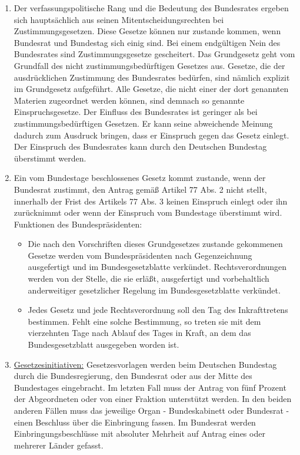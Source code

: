 \documentclass{article}
\begin{document}
\begin{enumerate}[label=(\alph*)]
		\item Der verfassungspolitische Rang und die Bedeutung des Bundesrates ergeben sich hauptsächlich aus seinen Mitentscheidungsrechten bei Zustimmungsgesetzen. Diese Gesetze können nur zustande kommen, wenn Bundesrat und Bundestag sich einig sind. Bei einem endgültigen Nein des Bundesrates sind Zustimmungsgesetze gescheitert. Das Grundgesetz geht vom Grundfall des nicht zustimmungsbedürftigen Gesetzes aus. Gesetze, die der ausdrücklichen Zustimmung des Bundesrates bedürfen, sind nämlich explizit im Grundgesetz aufgeführt. Alle Gesetze, die nicht einer der dort genannten Materien zugeordnet werden können, sind demnach so genannte Einspruchsgesetze. Der Einfluss des Bundesrates ist geringer als bei zustimmungsbedürftigen Gesetzen. Er kann seine abweichende Meinung dadurch zum Ausdruck bringen, dass er Einspruch gegen das Gesetz einlegt. Der Einspruch des Bundesrates kann durch den Deutschen Bundestag überstimmt werden.
		\item Ein vom Bundestage beschlossenes Gesetz kommt zustande, wenn der Bundesrat zustimmt, den Antrag gemäß Artikel 77 Abs. 2 nicht stellt, innerhalb der Frist des Artikels 77 Abs. 3 keinen Einspruch einlegt oder ihn zurücknimmt oder wenn der Einspruch vom Bundestage überstimmt wird. Funktionen des Bundespräsidenten:
		\begin{itemize}
			\item Die nach den Vorschriften dieses Grundgesetzes zustande gekommenen Gesetze werden vom Bundespräsidenten nach Gegenzeichnung ausgefertigt und im Bundesgesetzblatte verkündet. Rechtsverordnungen werden von der Stelle, die sie erläßt, ausgefertigt und vorbehaltlich anderweitiger gesetzlicher Regelung im Bundesgesetzblatte verkündet.
			\item Jedes Gesetz und jede Rechtsverordnung soll den Tag des Inkrafttretens bestimmen. Fehlt eine solche Bestimmung, so treten sie mit dem vierzehnten Tage nach Ablauf des Tages in Kraft, an dem das Bundesgesetzblatt ausgegeben worden ist.
		\end{itemize}
		\item \underline{Gesetzesinitiativen:} Gesetzesvorlagen werden beim Deutschen Bundestag durch die Bundesregierung, den Bundesrat oder aus der Mitte des Bundestages eingebracht. Im letzten Fall muss der Antrag von fünf Prozent der Abgeordneten oder von einer Fraktion unterstützt werden. In den beiden anderen Fällen muss das jeweilige Organ - Bundeskabinett oder Bundesrat - einen Beschluss über die Einbringung fassen. Im Bundesrat werden Einbringungsbeschlüsse mit absoluter Mehrheit auf Antrag eines oder mehrerer Länder gefasst.
		

\end{enumerate}
\end{document}
